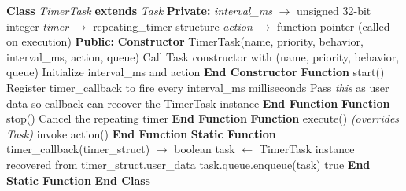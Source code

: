 \documentclass[a4paper,11pt]{article}
\begin{document}
\begin{algorithm}
\caption{TimerTask Class (Repeating Timer Task)}
\begin{algorithmic}[1]
\State \textbf{Class} \textit{TimerTask} \textbf{extends} \textit{Task}
\State \hspace{0.5cm} \textbf{Private:}
\State \hspace{1cm} \textit{interval\_ms} $\rightarrow$ unsigned 32-bit integer
\State \hspace{1cm} \textit{timer} $\rightarrow$ repeating\_timer structure
\State \hspace{1cm} \textit{action} $\rightarrow$ function pointer (called on execution)
\State \hspace{0.5cm} \textbf{Public:}
\State \hspace{1cm} \textbf{Constructor} TimerTask(name, priority, behavior, interval\_ms, action, queue)
\State \hspace{1.5cm} Call Task constructor with (name, priority, behavior, queue)
\State \hspace{1.5cm} Initialize interval\_ms and action
\State \hspace{1cm} \textbf{End Constructor}
\vspace{0.3cm}
\State \hspace{1cm} \textbf{Function} start()
\State \hspace{1.5cm} Register timer\_callback to fire every interval\_ms milliseconds
\State \hspace{1.5cm} Pass \textit{this} as user data so callback can recover the TimerTask instance
\State \hspace{1cm} \textbf{End Function}
\vspace{0.3cm}
\State \hspace{1cm} \textbf{Function} stop()
\State \hspace{1.5cm} Cancel the repeating timer
\State \hspace{1cm} \textbf{End Function}
\vspace{0.3cm}
\State \hspace{1cm} \textbf{Function} execute() \textit{(overrides Task)}
\State \hspace{1.5cm}  invoke action() \EndIf
\State \hspace{1cm} \textbf{End Function}
\vspace{0.3cm}
\State \hspace{1cm} \textbf{Static Function} timer\_callback(timer\_struct) $\rightarrow$ boolean
\State \hspace{1.5cm} task $\leftarrow$ TimerTask instance recovered from timer\_struct.user\_data
\State \hspace{1.5cm} task.queue.enqueue(task) \quad
\State \hspace{1.5cm} \Return true \quad 
\State \hspace{1cm} \textbf{End Static Function}
\State \textbf{End Class}
\end{algorithmic}
\end{algorithm}
\end{document}
